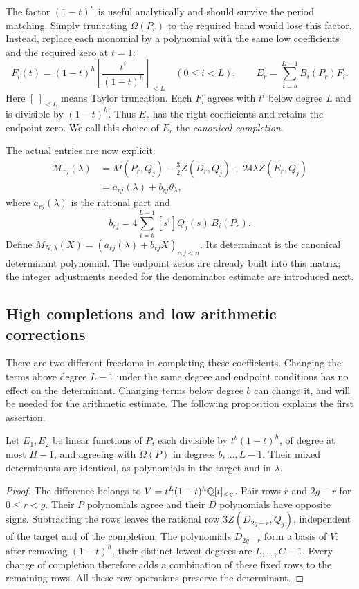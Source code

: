 The factor $(1-t)^h$ is useful analytically and should survive the
period matching. Simply truncating $\Omega(P_r)$ to the required band
would lose this factor. Instead, replace each monomial by a polynomial
with the same low coefficients and the required zero at $t=1$:
\begin{equation}\label{eq:completion-basis}
 F_i(t)=(1-t)^h\left[\frac{t^i}{(1-t)^h}\right]_{<L}
 \quad(0\le i<L),\qquad
 E_r=\sum_{i=b}^{L-1}B_i(P_r)F_i.
\end{equation}
Here $[\ ]_{<L}$ means Taylor truncation. Each $F_i$ agrees with $t^i$
below degree $L$ and is divisible by $(1-t)^h$. Thus $E_r$ has the
right coefficients and retains the endpoint zero. We call this choice
of $E_r$ the \emph{canonical completion}.

The actual entries are now explicit:
\begin{align*}
 \mathcal M_{rj}(\lambda)
 &=M(P_r,Q_j)-\tfrac32Z(D_r,Q_j)+24\lambda Z(E_r,Q_j)\\
 &=a_{rj}(\lambda)+b_{rj}\theta_\lambda,
\end{align*}
where $a_{rj}(\lambda)$ is the rational part and
\[
 b_{rj}=4\sum_{i=b}^{L-1}[s^i]Q_j(s)\,B_i(P_r).
\]
Define $M_{N,\lambda}(X)=(a_{rj}(\lambda)+b_{rj}X)_{r,j<n}$.
Its determinant is the canonical determinant polynomial. The endpoint
zeros are already built into this matrix; the integer adjustments
needed for the denominator estimate are introduced next.

\subsection{High completions and low arithmetic corrections}

There are two different freedoms in completing these coefficients.
Changing the terms above degree $L-1$ under the same degree and endpoint
conditions has no effect on the determinant. Changing terms below
degree $b$ can change it, and will be needed for the arithmetic estimate.
The following proposition explains the first assertion.

\begin{proposition}\label{prop:completion-invariance}
Let $E_1,E_2$ be linear functions of $P$, each divisible by
$t^b(1-t)^h$, of degree at most $H-1$, and agreeing with $\Omega(P)$
in degrees $b,\ldots,L-1$. Their mixed determinants are identical,
as polynomials in the target and in $\lambda$.
\end{proposition}
\begin{proof}
The difference belongs to
$V=t^L(1-t)^h\mathbb Q[t]_{<g}$. Pair rows $r$ and $2g-r$ for $0\le r<g$.
Their $P$ polynomials agree and their $D$ polynomials have opposite
signs. Subtracting the rows leaves the rational row
$3Z(D_{2g-r},Q_j)$, independent of the target and of the completion.
The polynomials $D_{2g-r}$ form a basis of $V$: after removing
$(1-t)^h$, their distinct lowest degrees are $L,\ldots,C-1$.
Every change of completion therefore adds a combination of these fixed
rows to the remaining rows. All these row operations preserve the
determinant.
\end{proof}


